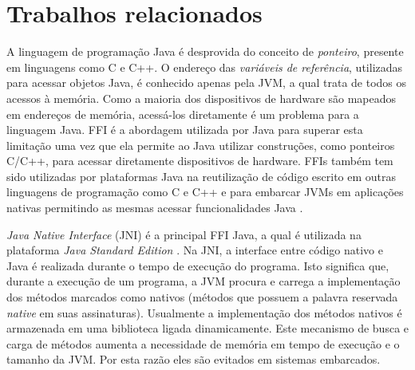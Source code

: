 \section{Trabalhos relacionados}
\label{sec:related_work}
%
A linguagem de programação Java é desprovida do conceito de \emph{ponteiro}, 
presente em linguagens como C e C++. 
O endereço das \emph{variáveis de referência}, utilizadas para acessar objetos Java,
é conhecido apenas pela JVM, a qual trata de todos os acessos à
memória. Como a maioria dos dispositivos de hardware são mapeados em endereços de
memória, acessá-los diretamente é um problema para a linguagem Java. 
FFI é a abordagem
utilizada por Java para superar esta limitação uma vez que ela permite ao Java
utilizar construções, como ponteiros C/C++, para acessar diretamente dispositivos
de hardware.
FFIs também tem sido utilizadas por plataformas Java na reutilização de código
escrito em outras linguagens de programação como C e C++ e para embarcar JVMs em 
aplicações nativas permitindo as mesmas acessar funcionalidades 
Java \cite{Liang:1999}.

\emph{Java Native Interface} (JNI) é a principal FFI Java, a qual é utilizada na
plataforma \emph{Java Standard Edition} \cite{Liang:1999}. 
Na JNI, a interface entre código nativo e Java é realizada durante o tempo de 
execução do programa. Isto significa que, durante a execução de um programa, 
a JVM procura e carrega a implementação dos métodos marcados como nativos 
(métodos que possuem a palavra reservada \emph{native} em suas assinaturas).
Usualmente a implementação dos métodos nativos é armazenada em uma biblioteca 
ligada dinamicamente.
Este mecanismo de busca e carga de métodos aumenta a necessidade de memória em
tempo de execução e o tamanho da JVM. Por esta razão eles são evitados em 
sistemas embarcados.

